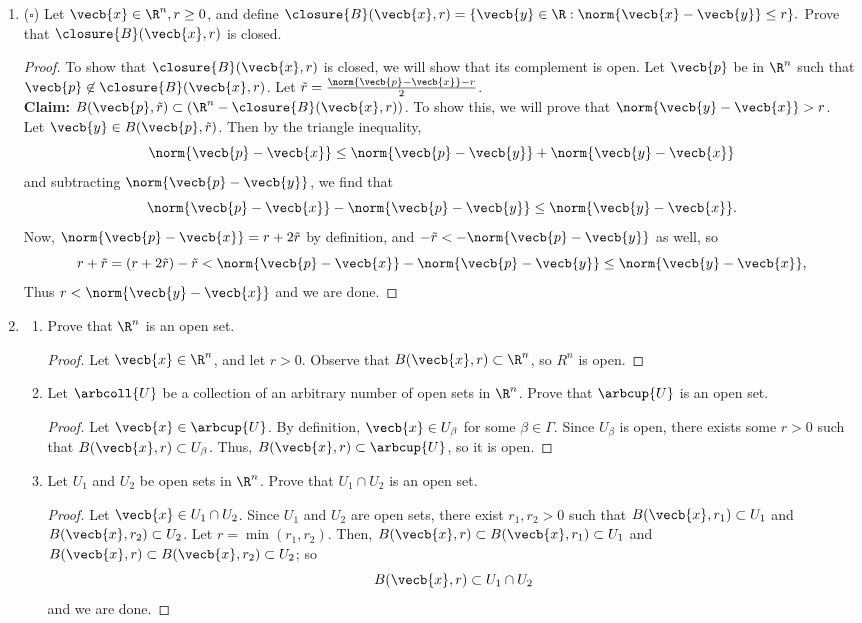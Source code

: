 \documentclass[a5paper]{article}
\theoremstyle{definition}%
\numberwithin{exercise}{section}
\theoremstyle{remark}%
\begin{document}
\begin{enumerate}
\item ($\square$) Let $\vecb{x}\in\R^n, r\geq0$, and define $\closure{B}(\vecb{x},r)=\{\vecb{y}\in\R:\norm{\vecb{x}-\vecb{y}}\leq r\}.$ Prove that $\closure{B}(\vecb{x},r)$ is closed. 
\begin{proof}
To show that $\closure{B}(\vecb{x},r)$ is closed, we will show that its complement is open. Let $\vecb{p}$ be in $\R^n$ such that $\vecb{p}\not\in\closure{B}(\vecb{x},r)$. Let $\tilde{r}=\frac{\norm{\vecb{p}-\vecb{x}}-r}{2}$. \\
\textbf{Claim:} $B(\vecb{p},\tilde{r}) \subset (\R^n-\closure{B}(\vecb{x},r))$.
To show this, we will prove that $\norm{\vecb{y}-\vecb{x}}>r$.\\
Let $\vecb{y}\in B(\vecb{p},\tilde{r})$. Then by the triangle inequality, 
$$\norm{\vecb{p}-\vecb{x}}\leq\norm{\vecb{p}-\vecb{y}}+\norm{\vecb{y}-\vecb{x}}$$
and subtracting $\norm{\vecb{p}-\vecb{y}}$, we find that 
$$\norm{\vecb{p}-\vecb{x}}-\norm{\vecb{p}-\vecb{y}}\leq\norm{\vecb{y}-\vecb{x}}.$$
Now, $\norm{\vecb{p}-\vecb{x}}=r+2\tilde{r}$ by definition, and $-\tilde{r}<-\norm{\vecb{p}-\vecb{y}}$ as well, so 
$$r+\tilde{r}=(r+2\tilde{r})-\tilde{r}<\norm{\vecb{p}-\vecb{x}}-\norm{\vecb{p}-\vecb{y}}\leq\norm{\vecb{y}-\vecb{x}},$$
Thus $r<\norm{\vecb{y}-\vecb{x}}$ and we are done. 
\end{proof}

\item \mbox{}
	\begin{enumerate}[label=(\alph*)]
	\item Prove that $\R^n$ is an open set. 
	\begin{proof}
	Let $\vecb{x}\in\R^n$, and let $r>0$. Observe that $B(\vecb{x},r)\subset\R^n$, so $R^n$ is open. 
	\end{proof}
	
	\item Let $\arbcoll{U}$ be a collection of an arbitrary number of open sets in $\R^n$. Prove that $\arbcup{U}$ is an open set. 
	\begin{proof}
	Let $\vecb{x}\in\arbcup{U}$. By definition, $\vecb{x}\in U_\beta$ for some $\beta\in\Gamma$. Since $U_\beta$ is open, there exists some $r>0$ such that $B(\vecb{x},r)\subset U_\beta$. Thus, $B(\vecb{x},r)\subset \arbcup{U}$, so it is open.
	\end{proof}
	
	\item Let $U_1$ and $U_2$ be open sets in $\R^n$. Prove that $U_1\cap U_2$ is an open set. 
	\begin{proof}
	Let $\vecb{x}\in U_1\cap U_2$. Since $U_1$ and $U_2$ are open sets, there exist $r_1, r_2 >0$ such that $B(\vecb{x},r_1)\subset U_1$ and $B(\vecb{x},r_2)\subset U_2$. Let $r=\min(r_1, r_2)$. Then, $B(\vecb{x},r)\subset B(\vecb{x},r_1)\subset U_1$ and $B(\vecb{x},r)\subset B(\vecb{x},r_2)\subset U_2$; so 
	$$B(\vecb{x},r)\subset U_1\cap U_2$$
	and we are done. 
	\end{proof}
	\end{enumerate}


\end{enumerate}
\end{document}
